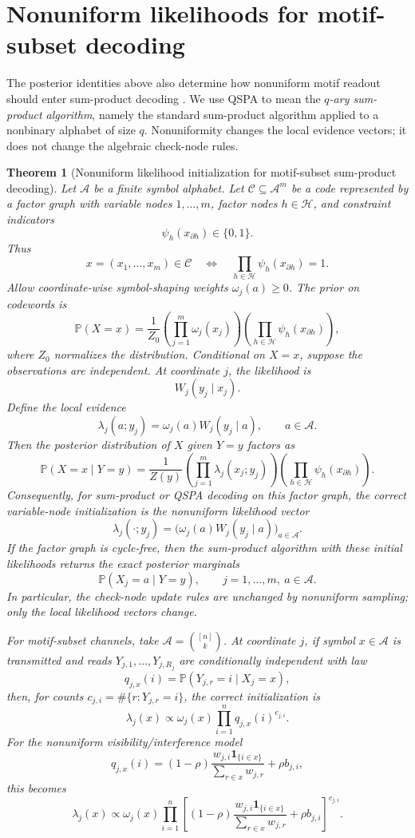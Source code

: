 \documentclass[11pt]{article}
\newtheorem{theorem}{Theorem}
\theoremstyle{definition}
\theoremstyle{remark}
\newcommand{\Pbb}{\mathbb P}
\newcommand{\1}{\mathbf 1}
\begin{document}
\section{Nonuniform likelihoods for motif-subset decoding}

The posterior identities above also determine how nonuniform motif readout should enter sum-product decoding \cite{KschischangFreyLoeliger2001}.  We use QSPA to mean the \emph{\(q\)-ary sum-product algorithm}, namely the standard sum-product algorithm applied to a nonbinary alphabet of size \(q\).  Nonuniformity changes the local evidence vectors; it does not change the algebraic check-node rules.

\begin{theorem}[Nonuniform likelihood initialization for motif-subset sum-product decoding]\label{thm:qspa-init}
Let \(\mathcal A\) be a finite symbol alphabet.  Let \(\mathcal C\subseteq\mathcal A^m\) be a code represented by a factor graph with variable nodes \(1,\ldots,m\), factor nodes \(h\in\mathcal H\), and constraint indicators
\[
  \psi_h(x_{\partial h})\in\{0,1\}.
\]
Thus
\[
  x=(x_1,\ldots,x_m)\in\mathcal C
  \quad\Longleftrightarrow\quad
  \prod_{h\in\mathcal H}\psi_h(x_{\partial h})=1.
\]
Allow coordinate-wise symbol-shaping weights \(\omega_j(a)\ge0\).  The prior on codewords is
\[
  \Pbb(X=x)=\frac1{Z_0}
  \left(\prod_{j=1}^m \omega_j(x_j)\right)
  \left(\prod_{h\in\mathcal H}\psi_h(x_{\partial h})\right),
\]
where \(Z_0\) normalizes the distribution.
Conditional on \(X=x\), suppose the observations are independent.  At coordinate \(j\), the likelihood is
\[
  W_j(y_j\mid x_j).
\]
Define the local evidence
\[
  \lambda_j(a;y_j)=\omega_j(a)W_j(y_j\mid a),
  \qquad a\in\mathcal A.
\]
Then the posterior distribution of \(X\) given \(Y=y\) factors as
\[
  \Pbb(X=x\mid Y=y)=\frac1{Z(y)}
  \left(\prod_{j=1}^m \lambda_j(x_j;y_j)\right)
  \left(\prod_{h\in\mathcal H}\psi_h(x_{\partial h})\right).
\]
Consequently, for sum-product or QSPA decoding on this factor graph, the correct variable-node initialization is the nonuniform likelihood vector
\[
  \lambda_j(\cdot;y_j)=\bigl(\omega_j(a)W_j(y_j\mid a)\bigr)_{a\in\mathcal A}.
\]
If the factor graph is cycle-free, then the sum-product algorithm with these initial likelihoods returns the exact posterior marginals
\[
  \Pbb(X_j=a\mid Y=y),
  \qquad j=1,\ldots,m,
  \ a\in\mathcal A.
\]
In particular, the check-node update rules are unchanged by nonuniform sampling; only the local likelihood vectors change.

For motif-subset channels, take \(\mathcal A=\binom{[n]}k\).  At coordinate \(j\), if symbol \(x\in\mathcal A\) is transmitted and reads \(Y_{j,1},\ldots,Y_{j,R_j}\) are conditionally independent with law
\[
  q_{j,x}(i)=\Pbb(Y_{j,r}=i\mid X_j=x),
\]
then, for counts \(c_{j,i}=\#\{r:Y_{j,r}=i\}\), the correct initialization is
\[
  \lambda_j(x)\propto
  \omega_j(x)\prod_{i=1}^n q_{j,x}(i)^{c_{j,i}}.
\]
For the nonuniform visibility/interference model
\[
  q_{j,x}(i)=
  (1-\rho)\frac{w_{j,i}\1_{\{i\in x\}}}{\sum_{r\in x}w_{j,r}}
  +\rho b_{j,i},
\]
this becomes
\[
  \lambda_j(x)\propto
  \omega_j(x)
  \prod_{i=1}^n
  \left[
  (1-\rho)\frac{w_{j,i}\1_{\{i\in x\}}}{\sum_{r\in x}w_{j,r}}
  +\rho b_{j,i}
  \right]^{c_{j,i}}.
\]
\end{theorem}
\end{document}
